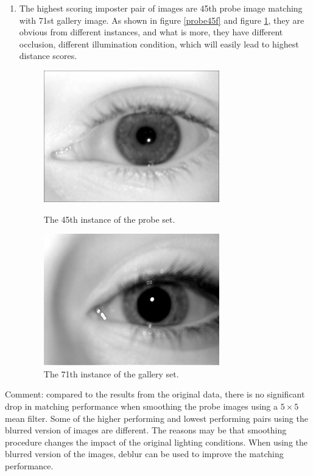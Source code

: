 \documentclass[a4paper]{article}
\begin{document}
\begin{spacing}{2.0}
\begin{enumerate}
	
	\item The highest scoring imposter pair of images are 45th probe image matching with 71st gallery image. As shown in figure \ref{probe45f} and figure \ref{gallery71f}, they are obvious from different instances, and what is more, they have different occlusion, different illumination condition, which will easily lead to highest distance scores.
	\begin{figure}[H]
	\begin{minipage}[t]{0.5\linewidth}
	\centering
	\includegraphics[width = 3in]{probe45filtered.jpg}
	\caption{The 45th instance of the probe set.}
	\label{probe45f}
	\end{minipage}
	\begin{minipage}[t]{0.5\linewidth}
	\centering
	\includegraphics[width = 3in]{gallery71.jpg}
	\caption{The 71th instance of the gallery set.}
	\label{gallery71f}
	\end{minipage}
	\end{figure}
	
	\end{enumerate}
	
	Comment: compared to the results from the original data, there is no significant drop in matching performance when smoothing the probe images using a $5 \times 5$ mean filter. Some of the higher performing and lowest performing pairs using the blurred version of images are different. The reasons may be that smoothing procedure changes the impact of the original lighting conditions. When using the blurred version of the images, deblur can be used to improve the matching performance. 
	


	
\end{spacing}
\end{document}
